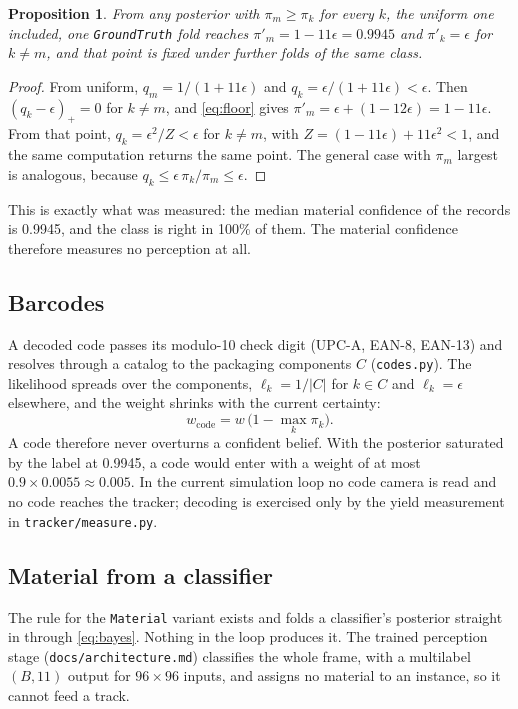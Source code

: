 \documentclass[11pt,a4paper]{article}
\newtheorem{proposition}{Proposition}
\theoremstyle{definition}
\theoremstyle{remark}
\newcommand{\code}[1]{\texttt{#1}}
\begin{document}
\begin{proposition}
From any posterior with $\pi_m \ge \pi_k$ for every $k$, the uniform one
included, one \code{GroundTruth} fold reaches $\pi'_m = 1 - 11\epsilon = 0.9945$
and $\pi'_k = \epsilon$ for $k\ne m$, and that point is fixed under further
folds of the same class.
\end{proposition}
\begin{proof}
From uniform, $q_m = 1/(1+11\epsilon)$ and $q_k = \epsilon/(1+11\epsilon) <
\epsilon$. Then $(q_k-\epsilon)_+ = 0$ for $k\ne m$, and \eqref{eq:floor} gives
$\pi'_m = \epsilon + (1-12\epsilon) = 1-11\epsilon$. From that point,
$q_k = \epsilon^2/Z < \epsilon$ for $k \ne m$, with
$Z = (1-11\epsilon) + 11\epsilon^2 < 1$, and the same computation returns the
same point. The general case with $\pi_m$ largest is analogous, because
$q_k \le \epsilon\,\pi_k/\pi_m \le \epsilon$.
\end{proof}

This is exactly what was measured: the median material confidence of the records
is 0.9945, and the class is right in 100\% of them. The material confidence
therefore measures no perception at all.

\subsection{Barcodes}
\label{sec:codes}

A decoded code passes its modulo-10 check digit (UPC-A, EAN-8, EAN-13) and
resolves through a catalog to the packaging components $C$ (\code{codes.py}).
The likelihood spreads over the components, $\ell_k = 1/|C|$ for $k\in C$ and
$\ell_k = \epsilon$ elsewhere, and the weight shrinks with the current
certainty:
\begin{equation}
w_{\text{code}} = w\,\bigl(1 - \max_k \pi_k\bigr).
\end{equation}
A code therefore never overturns a confident belief. With the posterior
saturated by the label at 0.9945, a code would enter with a weight of at most
$0.9\times0.0055\approx 0.005$. In the current simulation loop no code camera is
read and no code reaches the tracker; decoding is exercised only by the yield
measurement in \code{tracker/measure.py}.

\subsection{Material from a classifier}

The rule for the \code{Material} variant exists and folds a classifier's
posterior straight in through \eqref{eq:bayes}. Nothing in the loop produces it.
The trained perception stage (\code{docs/architecture.md}) classifies the whole
frame, with a multilabel $(B,11)$ output for $96\times96$ inputs, and assigns no
material to an instance, so it cannot feed a track.
\end{document}
